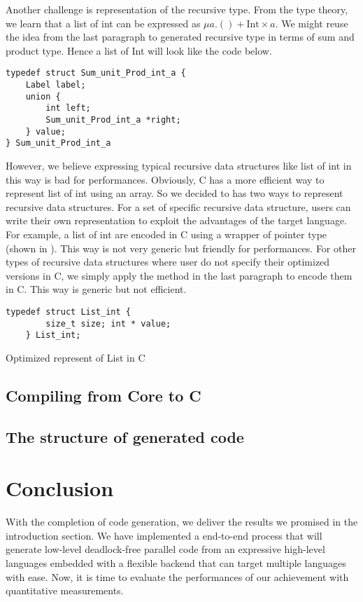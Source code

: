 Another challenge is representation of the recursive type. From the type theory, we learn that a list of int can be expressed as $\mu a. () + \text{Int} \times a$. We might reuse the idea from the last paragraph to generated recursive type in terms of sum and product type. Hence a list of Int will look like the code below.
\begin{verbatim}
typedef struct Sum_unit_Prod_int_a {
    Label label;
    union {
        int left;
        Sum_unit_Prod_int_a *right;
    } value;
} Sum_unit_Prod_int_a
\end{verbatim}
However, we believe expressing typical recursive data structures like list of int in this way is bad for performances. Obviously, C has a more efficient way to represent list of int using an array. So we decided to has two ways to represent recursive data structures. For a set of specific recursive data structure, users can write their own representation to exploit the advantages of the target language. For example, a list of int are encoded in C using a wrapper of pointer type (shown in ). This way is not very generic but friendly for performances. For other types of recursive data structures where user do not specify their optimized versions in C, we simply apply the method in the last paragraph to encode them in C. This way is generic but not efficient.
\begin{code}
\begin{verbatim}
typedef struct List_int {
        size_t size; int * value;
    } List_int;
\end{verbatim}
\caption{Optimized represent of List in C}
\label{codegen:code:list}
\end{code}
\subsection{Compiling from Core to C}
\subsection{The structure of generated code}
\section{Conclusion}
With the completion of code generation, we deliver the results we promised in the introduction section. We have implemented a end-to-end process that will generate low-level deadlock-free parallel code from an expressive high-level languages embedded with a flexible backend that can target multiple languages with ease. Now, it is time to evaluate the performances of our achievement with quantitative measurements.
